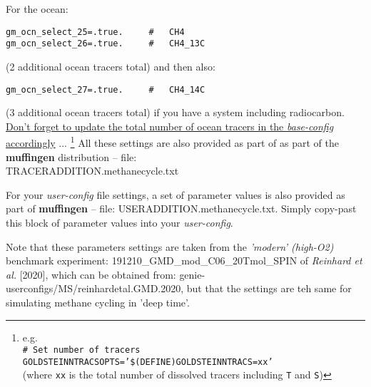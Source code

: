 \vspace{1mm}
\noindent For the ocean:
\small\vspace{-2pt}\begin{verbatim}
gm_ocn_select_25=.true.     #   CH4
gm_ocn_select_26=.true.     #   CH4_13C
\end{verbatim}\vspace{-2pt}\normalsize
(2 additional ocean tracers total) and then also:
\small\vspace{-2pt}\begin{verbatim}
gm_ocn_select_27=.true.     #   CH4_14C
\end{verbatim}\vspace{-2pt}\normalsize
(3 additional ocean tracers total) if you have a system including radiocarbon.
\\\uline{Don't forget to update the total number of ocean tracers in the \textit{base-config} accordingly} ...
\footnote{e.g.
\\\texttt{\# Set number of tracers}
\\\texttt{GOLDSTEINNTRACSOPTS='\$(DEFINE)GOLDSTEINNTRACS=xx'}
\\(where \texttt{xx} is the total number of dissolved tracers including \texttt{T} and \texttt{S})
}
\vspace{1mm}
\noindent All these settings are also provided as part of as part of the \textbf{muffingen} distribution -- file: \\\textsf{\footnotesize TRACERADDITION.methanecycle.txt}

\vspace{1mm}
\noindent For your \textit{user-config} file settings, a set of parameter values is also provided as part of \textbf{muffingen} -- file: \textsf{\footnotesize USERADDITION.methanecycle.txt}. Simply copy-past this block of parameter values into your \textit{user-config}.

\vspace{1mm}
Note that these parameters settings are taken from the \textit{'modern' (high-O2)} benchmark experiment: \textsf{\footnotesize 191210\_GMD\_mod\_C06\_20Tmol\_SPIN} of \textit{Reinhard et al.} [2020], which can be obtained from: \textsf{\footnotesize genie-userconfigs/MS/reinhardetal.GMD.2020}, but that the settings are teh same for simulating methane cycling in 'deep time'.

